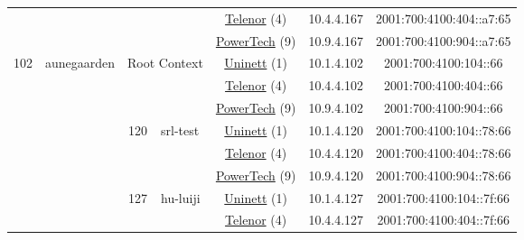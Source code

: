 \begin{small}
\begin{center}
\begin{longtable}{|c|c|c|c|c|c|c|c|}
  &  &  &  & \multicolumn{2}{|c|}{\tiny{\href{https://www.telenor.no}{Telenor} (4)}} & \tiny{10.4.4.167} & \tiny{2001:700:4100:404::a7:65} \\* \cline{5-5}\cline{6-6}\cline{7-7}\cline{8-8}
  &  &  &  & \multicolumn{2}{|c|}{\tiny{\href{http://www.powertech.no}{PowerTech} (9)}} & \tiny{10.9.4.167} & \tiny{2001:700:4100:904::a7:65} \\ \hline
 \multirow{27}{*}{\tiny{102}} & \multicolumn{1}{|l|}{\multirow{27}{*}{\tiny{aunegaarden}}} & \multicolumn{2}{|c|}{\multirow{3}{*}{\tiny{Root Context}}} & \multicolumn{2}{|c|}{\tiny{\href{https://www.uninett.no}{Uninett} (1)}} & \tiny{10.1.4.102} & \tiny{2001:700:4100:104::66} \\* \cline{5-5}\cline{6-6}\cline{7-7}\cline{8-8}
  &  & \multicolumn{2}{|c|}{} & \multicolumn{2}{|c|}{\tiny{\href{https://www.telenor.no}{Telenor} (4)}} & \tiny{10.4.4.102} & \tiny{2001:700:4100:404::66} \\* \cline{5-5}\cline{6-6}\cline{7-7}\cline{8-8}
  &  & \multicolumn{2}{|c|}{} & \multicolumn{2}{|c|}{\tiny{\href{http://www.powertech.no}{PowerTech} (9)}} & \tiny{10.9.4.102} & \tiny{2001:700:4100:904::66} \\* \cline{3-3}\cline{4-4}\cline{5-5}\cline{6-6}\cline{7-7}\cline{8-8}
  &  & \multirow{3}{*}{\tiny{120}} & \multicolumn{1}{|l|}{\multirow{3}{*}{\tiny{srl-test}}} & \multicolumn{2}{|c|}{\tiny{\href{https://www.uninett.no}{Uninett} (1)}} & \tiny{10.1.4.120} & \tiny{2001:700:4100:104::78:66} \\* \cline{5-5}\cline{6-6}\cline{7-7}\cline{8-8}
  &  &  &  & \multicolumn{2}{|c|}{\tiny{\href{https://www.telenor.no}{Telenor} (4)}} & \tiny{10.4.4.120} & \tiny{2001:700:4100:404::78:66} \\* \cline{5-5}\cline{6-6}\cline{7-7}\cline{8-8}
  &  &  &  & \multicolumn{2}{|c|}{\tiny{\href{http://www.powertech.no}{PowerTech} (9)}} & \tiny{10.9.4.120} & \tiny{2001:700:4100:904::78:66} \\* \cline{3-3}\cline{4-4}\cline{5-5}\cline{6-6}\cline{7-7}\cline{8-8}
  &  & \multirow{3}{*}{\tiny{127}} & \multicolumn{1}{|l|}{\multirow{3}{*}{\tiny{hu-luiji}}} & \multicolumn{2}{|c|}{\tiny{\href{https://www.uninett.no}{Uninett} (1)}} & \tiny{10.1.4.127} & \tiny{2001:700:4100:104::7f:66} \\* \cline{5-5}\cline{6-6}\cline{7-7}\cline{8-8}
  &  &  &  & \multicolumn{2}{|c|}{\tiny{\href{https://www.telenor.no}{Telenor} (4)}} & \tiny{10.4.4.127} & \tiny{2001:700:4100:404::7f:66} \\* \cline{5-5}\cline{6-6}\cline{7-7}\cline{8-8}

\end{longtable}
\end{center}
\end{small}
